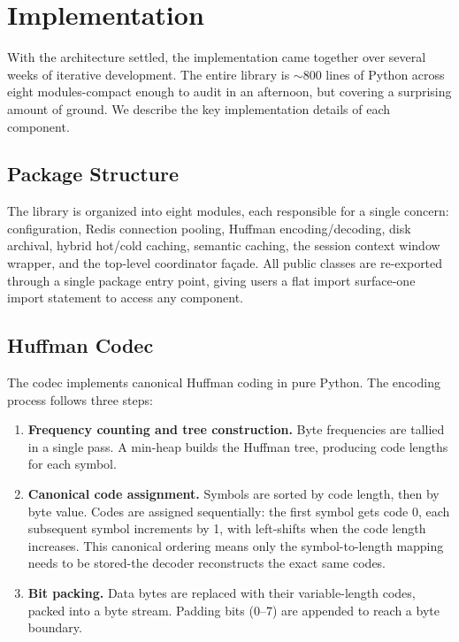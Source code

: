 \documentclass[conference]{IEEEtran}
\begin{document}
\section{Implementation}
\label{sec:implementation}

With the architecture settled, the implementation came together over several weeks of iterative development. The entire library is ${\sim}800$ lines of Python across eight modules-compact enough to audit in an afternoon, but covering a surprising amount of ground. We describe the key implementation details of each component.

\subsection{Package Structure}

The library is organized into eight modules, each responsible for a single concern: configuration, Redis connection pooling, Huffman encoding/decoding, disk archival, hybrid hot/cold caching, semantic caching, the session context window wrapper, and the top-level coordinator fa\c{c}ade. All public classes are re-exported through a single package entry point, giving users a flat import surface-one import statement to access any component.

\subsection{Huffman Codec}

The codec implements canonical Huffman coding in pure Python. The encoding process follows three steps:

\begin{enumerate}
\item \textbf{Frequency counting and tree construction.} Byte frequencies are tallied in a single pass. A min-heap builds the Huffman tree, producing code lengths for each symbol.

\item \textbf{Canonical code assignment.} Symbols are sorted by code length, then by byte value. Codes are assigned sequentially: the first symbol gets code 0, each subsequent symbol increments by 1, with left-shifts when the code length increases. This canonical ordering means only the symbol-to-length mapping needs to be stored-the decoder reconstructs the exact same codes.

\item \textbf{Bit packing.} Data bytes are replaced with their variable-length codes, packed into a byte stream. Padding bits (0--7) are appended to reach a byte boundary.
\end{enumerate}
\end{document}
